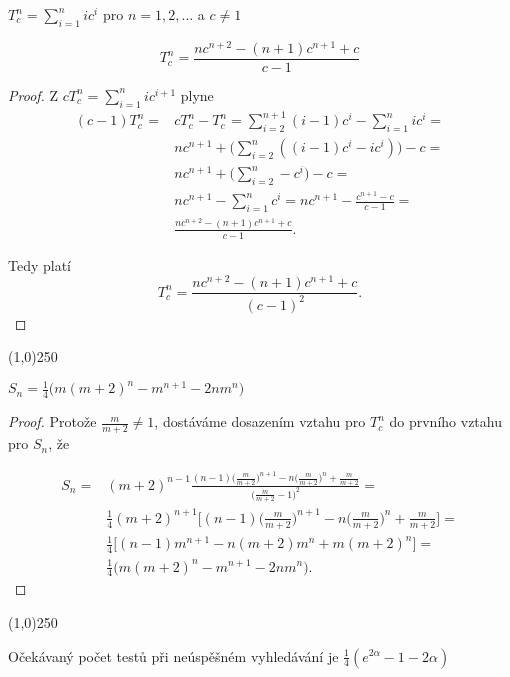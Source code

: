 \documentclass[a4paper,12pt]{article}
\newenvironment{myproof}{
  \begin{proof}
    
  }{
  \end{proof}
  \begin{center}
   \line(1,0){250}
   \end{center}
  }
\begin{document}
\begin{definice}
    $T_c^n=\sum_{i=1}^nic^i$ pro $n=1,2,\dots$ a $c\ne 1$
\end{definice}

\begin{lemma}
    $$T_c^n = \frac {nc^{n+2}-(n+1)c^{n+1}+c}{c-1}$$
\end{lemma}

\begin{myproof}
Z $cT_c^n=\sum_{i=1}^nic^{i+1}$ plyne 
\begin{align*}(c-1)T_c^n=&cT_c^n-T_c^n=\sum_{i=2}^{n+1}(i-1)c^i-\sum_{i
=1}^nic^i=\\
&nc^{n+1}+\big(\sum_{i=2}^n((i-1)c^i-ic^i)\big)-c=\\
&nc^{n+1}+\big(\sum_{i=2}^n-c^i\big)-c=\\
&nc^{n+1}-\sum_{i=1}^nc^i=nc^{n+1}-\frac {c^{n+1}-c}{c-1}=\\
&\frac {nc^{n+2}-(n+1)c^{n+1}+c}{c-1}.\end{align*}

Tedy platí 
$$T_c^n=\frac {nc^{n+2}-(n+1)c^{n+1}+c}{(c-1)^2}.$$
\end{myproof}

\begin{lemma}
    $S_n = \frac 14\big(m(m+2)^n-m^{n+1}-2nm^n\big)$
\end{lemma}

\begin{myproof}
Protože $\frac m{m+2}\ne 1$, dostáváme dosazením vztahu pro $T_c^n$ do prvního vztahu pro $S_n$, že 

\begin{align*} S_n=&(m+2)^{n-1}\frac {(n-1)\big(\frac m{m+2}\big)^{n+1}
-n\big(\frac m{m+2}\big)^n+\frac m{m+2}}{\big(\frac m{m+2}-1\big)^
2}=\\
&\frac 14(m+2)^{n+1}\big[(n-1)\big(\frac m{m+2}\big)^{n+1}-n\big(\frac 
m{m+2}\big)^n+\frac m{m+2}\big]=\\
&\frac 14\big[(n-1)m^{n+1}-n(m+2)m^n+m(m+2)^n\big]=\\
&\frac 14\big(m(m+2)^n-m^{n+1}-2nm^n\big).\end{align*}
\end{myproof}

\begin{veta}
    Očekávaný počet testů při neúspěšném 
    vyhledávání je $\frac 14(e^{2\alpha}-1-2\alpha )$
\end{veta}
\end{document}
